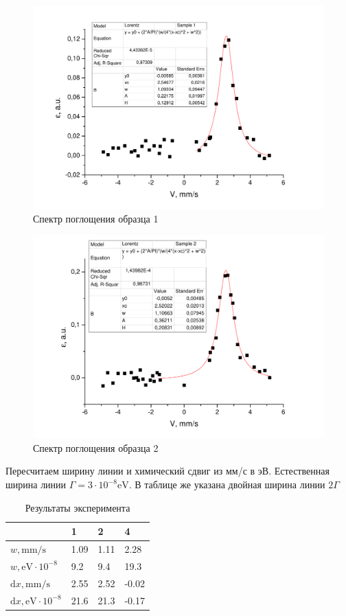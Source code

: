 \documentclass[a4paper,12pt]{article}
\newcommand{\dif}{\mathrm{d}}
\begin{document}
			\begin{figure}[h!]
				\centering
				\includegraphics[width=0.95\linewidth]{sample1}
				\caption{Спектр поглощения образца 1}
			\end{figure}
			
			\begin{figure}[h!]
				\centering
				\includegraphics[width=0.95\linewidth]{sample2}
				\caption{Спектр поглощения образца 2}
			\end{figure}
		
		\newpage
		
		Пересчитаем ширину линии и химический сдвиг из мм/с в эВ. Естественная ширина линии $\Gamma = 3\cdot10^{-8}\mathrm{eV}$. В таблице же указана двойная ширина линии $2\Gamma$
		
		\begin{table}[h!]
			\centering
			\caption{Результаты эксперимента}
			\label{my-label}
			\begin{tabular}{|l|l|l|l|}
				\hline
				& 1 & 2 & 4 \\ \hline
				$w, \mathrm{mm/s}$ & 1.09  & 1.11  & 2.28  \\ \hline
				$w, \mathrm{eV}\cdot 10^{-8}$   & 9.2  & 9.4  & 19.3  \\ \hline
				$\dif x, \mathrm{mm/s}$      & 2.55  & 2.52  & -0.02  \\ \hline
				$\dif x, \mathrm{eV}\cdot 10^{-8}$      & 21.6  & 21.3  &  -0.17 \\ \hline
			\end{tabular}
		\end{table}
	
\end{document}
